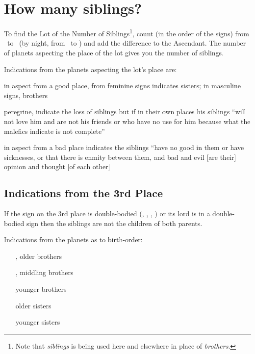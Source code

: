 \section{How many siblings?}
To find the Lot of the Number of Siblings\footnote{Note that \textsl{siblings} is being used here and elsewhere in place of \textsl{brothers}.}, count (in the order of the signs) from \Mercury\, to \Jupiter\, (by night, from \Jupiter\, to \Mercury) and add the difference to the Ascendant. The number of planets aspecting the place of the lot gives you the number of siblings.

Indications from the planets aspecting the lot's place are:
\begin{description}[labelindent=0em , labelwidth=6em, labelsep=0.5em, leftmargin =!]
\item [\Venus,\Mercury] in aspect from a good place, from feminine signs indicates sisters; in masculine signs, brothers

\item[\Saturn,\Mars,\Sun\,\Moon] peregrine, indicate the loss of siblings but if in their own places his siblings ``will not love him and are not his friends or who have no use for him because what the malefics indicate is not complete''

\item[any planet] in aspect from a bad place indicates the siblings ``have no good in them or have sicknesses, or that there is enmity between them, and bad and evil [are their] opinion and thought [of each other]
\end{description}

\subsection{Indications from the 3rd Place}
If the sign on the 3rd place is double-bodied (\Gemini, \Virgo, \Sagittarius, \Pisces) or its lord is in a double-bodied sign then the siblings are not the children of both parents.

Indications from the planets as to birth-order:
\begin{itemize}
\item[\Saturn,\Mars] older brothers
\item[\Jupiter,\Mars] middling brothers
\item[\Mercury] younger brothers
\item[\Moon] older sisters
\item[\Venus] younger sisters
\end{itemize}

